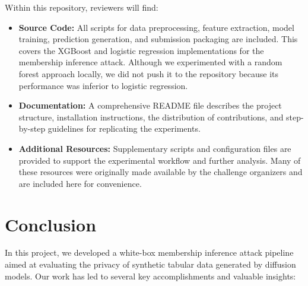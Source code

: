 \documentclass[12pt]{article}
\begin{document}
Within this repository, reviewers will find:
\begin{itemize}
    \item \textbf{Source Code:}  
    All scripts for data preprocessing, feature extraction, model training, prediction generation, and submission packaging are included. This covers the XGBoost and logistic regression implementations for the membership inference attack. Although we experimented with a random forest approach locally, we did not push it to the repository because its performance was inferior to logistic regression.

    \item \textbf{Documentation:}  
    A comprehensive README file describes the project structure, installation instructions, the distribution of contributions, and step-by-step guidelines for replicating the experiments.

    \item \textbf{Additional Resources:}  
    Supplementary scripts and configuration files are provided to support the experimental workflow and further analysis. Many of these resources were originally made available by the challenge organizers and are included here for convenience.
\end{itemize}

\section{Conclusion}
\label{sec:conclusion}
In this project, we developed a white-box membership inference attack pipeline aimed at evaluating the privacy of synthetic tabular data generated by diffusion models. Our work has led to several key accomplishments and valuable insights:
\end{document}
